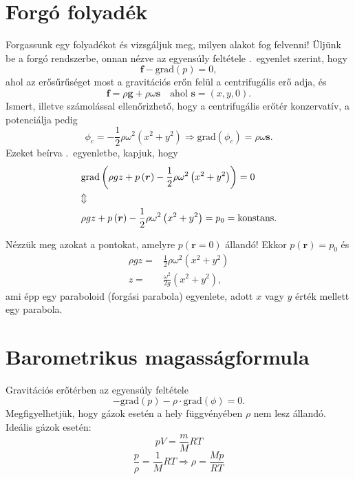 \documentclass[12pt,a4paper]{scrartcl}
\let\mathbf\bm
\begin{document}
\section{Forgó folyadék}
Forgassunk egy folyadékot és vizsgáljuk meg, milyen alakot fog felvenni! Üljünk be a forgó rendszerbe, onnan nézve az egyensúly feltétele .\ egyenlet szerint, hogy
\begin{equation} \label{eq:forgo_foly_alapegyenlet}
{\mathbf{f}} - {\text{grad}}\left( p \right) = 0,
\end{equation}
ahol az erősűrűséget most a gravitációs erőn felül a centrifugális erő adja, és
\[{\mathbf{f}} = \rho {\mathbf{g}} + \rho \omega {\mathbf{s}}\quad\text{ahol } {\mathbf{s}} = \left( {x,y,0} \right).\]
Ismert, illetve számolással ellenőrizhető, hogy a centrifugális erőtér konzervatív, a potenciálja pedig
\[{\phi _c} =  - \frac{1}{2}\rho {\omega ^2}\left( {{x^2} + {y^2}} \right) \Rightarrow {\text{grad}}\left( {{\phi _c}} \right) = \rho \omega {\mathbf{s}}.\]
Ezeket beírva .\ egyenletbe, kapjuk, hogy
\begin{gather*}
  {\text{grad}}\left( \rho gz + {p\left( {\mathbf{r}} \right) - \frac{1}{2}\rho {\omega ^2}\left( {{x^2} + {y^2}} \right)} \right) = 0 \hfill \\
   \Updownarrow  \hfill \\
  \rho gz  + p\left( {\mathbf{r}} \right) - \frac{1}{2}\rho {\omega ^2}\left( {{x^2} + {y^2}} \right) = {p_0} = \text{konstans.} \hfill \\ 
\end{gather*}

Nézzük meg azokat a pontokat, amelyre $p\left( {{\mathbf{r}} = 0} \right)$ állandó! Ekkor $p\left( {\mathbf{r}} \right) = {p_0}$ és 
\begin{align}
  \rho gz =  & \frac{1}{2}\rho {\omega ^2}\left( {{x^2} + {y^2}} \right) \nonumber \\ 
  z =  & \frac{{{\omega ^2}}}{{2g}}\left( {{x^2} + {y^2}} \right),
\end{align} 
ami épp egy paraboloid (forgási parabola) egyenlete, adott $x$ vagy $y$ érték mellett egy parabola.

\section{Barometrikus magasságformula}
Gravitációs erőtérben az egyensúly feltétele \[ - {\text{grad}}\left( p \right) - \rho  \cdot {\text{grad}}\left( \phi  \right) = 0.\]
Megfigyelhetjük, hogy gázok esetén a hely függvényében $\rho$ nem lesz állandó. Ideális gázok esetén:
\[pV = \frac{m}{M}RT\]
\begin{equation} \label{eq:rho_p_prop}
\frac{p}{\rho } = \frac{1}{M}RT \Rightarrow \rho  = \frac{{Mp}}{{RT}}
\end{equation}
\end{document}
